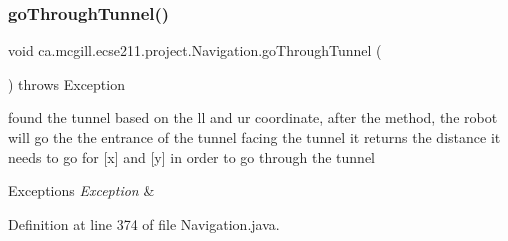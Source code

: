\subsubsection{\texorpdfstring{go\+Through\+Tunnel()}{goThroughTunnel()}}
{\footnotesize\ttfamily void ca.\+mcgill.\+ecse211.\+project.\+Navigation.\+go\+Through\+Tunnel (\begin{DoxyParamCaption}{ }\end{DoxyParamCaption}) throws Exception}

found the tunnel based on the ll and ur coordinate, after the method, the robot will go the the entrance of the tunnel facing the tunnel it returns the distance it needs to go for \mbox{[}x\mbox{]} and \mbox{[}y\mbox{]} in order to go through the tunnel


\begin{DoxyExceptions}{Exceptions}
{\em Exception} & \\
\hline
\end{DoxyExceptions}


Definition at line 374 of file Navigation.\+java.



